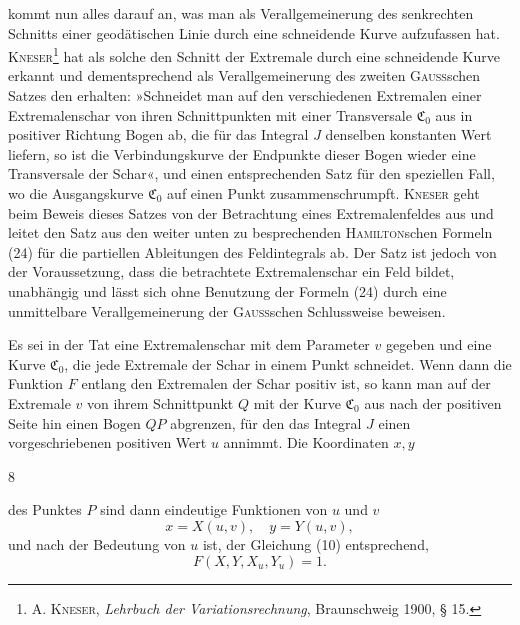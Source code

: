 kommt nun alles darauf an, was man als Verallgemeinerung des
senkrechten Schnitts einer geodätischen Linie durch eine schneidende Kurve
aufzufassen hat. \textsc{Kneser}\footnote{A. \textsc{Kneser}, \textit{Lehrbuch der Variationsrechnung}, Braunschweig 1900, § 15.} hat als solche den  Schnitt der
Extremale durch eine schneidende Kurve erkannt und dementsprechend als
Verallgemeinerung des zweiten \textsc{Gauss}schen Satzes den 
erhalten: »Schneidet man auf den verschiedenen Extremalen einer Extremalenschar
von ihren Schnittpunkten mit einer Transversale $\mathfrak C_0$ aus in positiver
Richtung Bogen ab, die für das Integral $J$ denselben konstanten Wert liefern,
so ist die Verbindungskurve der Endpunkte dieser Bogen wieder eine Transversale
der Schar«, und einen entsprechenden Satz für den speziellen Fall,
wo die Ausgangskurve $\mathfrak C_0$ auf einen Punkt zusammenschrumpft. \textsc{Kneser} geht
beim Beweis dieses Satzes von der Betrachtung eines Extremalenfeldes aus
und leitet den Satz aus den weiter unten zu besprechenden \textsc{Hamilton}schen
Formeln (24) für die partiellen Ableitungen des Feldintegrals ab. Der Satz
ist jedoch von der Voraussetzung, dass die betrachtete Extremalenschar ein
Feld bildet, unabhängig und lässt sich ohne Benutzung der Formeln (24) durch
eine unmittelbare Verallgemeinerung der \textsc{Gauss}schen Schlussweise beweisen.

Es sei in der Tat eine Extremalenschar mit dem Parameter $v$ gegeben und
eine Kurve $\mathfrak C_0$, die jede Extremale der Schar in einem Punkt schneidet. Wenn
dann die Funktion $F$ entlang den Extremalen der Schar positiv ist, so kann
man auf der Extremale $v$ von ihrem Schnittpunkt $Q$ mit der Kurve $\mathfrak C_0$ aus
nach der positiven Seite hin einen Bogen $QP$ abgrenzen, für den das Integral
$J$ einen vorgeschriebenen positiven Wert $u$ annimmt. Die Koordinaten $x,y$
\par\smallskip{}\hfill{\small 8}\par
\clearpage{}
\noindent des Punktes $P$ sind dann eindeutige Funktionen von $u$ und $v$
\begin{equation*}\tag{12}
x=X(u,v),\quad y=Y(u,v),
\end{equation*}
und nach der Bedeutung von $u$ ist, der Gleichung (10) entsprechend,
\begin{equation*}\tag{13}
F(X,Y,X_u,Y_u)=1.
\end{equation*}

